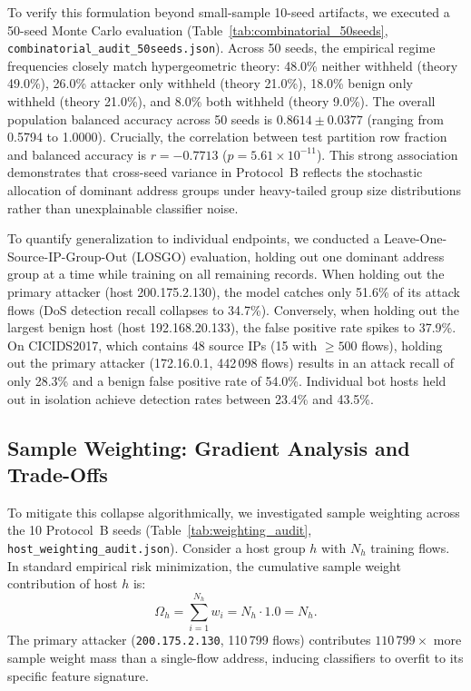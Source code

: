 \documentclass[journal]{IEEEtran}
\begin{document}


To verify this formulation beyond small-sample 10-seed artifacts, we executed a 50-seed Monte Carlo evaluation (Table~\ref{tab:combinatorial_50seeds}, \texttt{combinatorial\_audit\_50seeds.json}). Across 50 seeds, the empirical regime frequencies closely match hypergeometric theory: 48.0\% neither withheld (theory 49.0\%), 26.0\% attacker only withheld (theory 21.0\%), 18.0\% benign only withheld (theory 21.0\%), and 8.0\% both withheld (theory 9.0\%). The overall population balanced accuracy across 50 seeds is $0.8614\pm0.0377$ (ranging from 0.5794 to 1.0000). Crucially, the correlation between test partition row fraction and balanced accuracy is $r = -0.7713$ ($p = 5.61 \times 10^{-11}$). This strong association demonstrates that cross-seed variance in Protocol~B reflects the stochastic allocation of dominant address groups under heavy-tailed group size distributions rather than unexplainable classifier noise.

To quantify generalization to individual endpoints, we conducted a Leave-One-Source-IP-Group-Out (LOSGO) evaluation, holding out one dominant address group at a time while training on all remaining records. When holding out the primary attacker (host 200.175.2.130), the model catches only 51.6\% of its attack flows (DoS detection recall collapses to 34.7\%). Conversely, when holding out the largest benign host (host 192.168.20.133), the false positive rate spikes to 37.9\%. On CICIDS2017, which contains 48 source IPs (15 with $\ge 500$ flows), holding out the primary attacker (172.16.0.1, 442\,098 flows) results in an attack recall of only 28.3\% and a benign false positive rate of 54.0\%. Individual bot hosts held out in isolation achieve detection rates between 23.4\% and 43.5\%.

\subsection{Sample Weighting: Gradient Analysis and Trade-Offs}
To mitigate this collapse algorithmically, we investigated sample weighting across the 10 Protocol~B seeds (Table~\ref{tab:weighting_audit}, \texttt{host\_weighting\_audit.json}). Consider a host group $h$ with $N_h$ training flows. In standard empirical risk minimization, the cumulative sample weight contribution of host $h$ is:
\begin{equation}
\Omega_h = \sum_{i=1}^{N_h} w_i = N_h \cdot 1.0 = N_h.
\end{equation}
The primary attacker (\texttt{200.175.2.130}, 110\,799 flows) contributes $110\,799\times$ more sample weight mass than a single-flow address, inducing classifiers to overfit to its specific feature signature.
\end{document}
